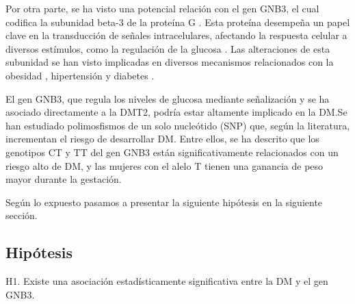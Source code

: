 Por otra parte, se ha visto una potencial relación con el gen GNB3, el cual codifica la subunidad beta-3 de la proteína G \cite{Feng2019}. Esta proteína desempeña un papel clave en la transducción de señales intracelulares, afectando la respuesta celular a diversos estímulos, como la regulación de la glucosa \cite{Neves2002}. Las alteraciones de esta subunidad se han visto implicadas en diversos mecanismos relacionados con la obesidad \cite{Hsiao2013}, hipertensión y diabetes \cite{Siffert2005}.
 
El gen GNB3, que regula los niveles de glucosa mediante señalización y se ha asociado directamente a la DMT2\cite{Rizvi2016}, podría estar altamente implicado en la DM.Se han estudiado polimosfismos de un solo nucleótido (SNP) que, según la literatura, incrementan el riesgo de desarrollar DM\cite{ortega}. Entre ellos, se ha descrito que los genotipos CT y TT  del gen GNB3 están significativamente relacionados con un riesgo alto de DM, y las mujeres con el alelo T tienen una ganancia de peso mayor durante la gestación\cite{ortega}. 


Según lo expuesto pasamos a presentar la siguiente hipótesis en la siguiente sección.

\subsection{Hipótesis}

H1. Existe una asociación estadísticamente significativa entre la DM y el gen GNB3.